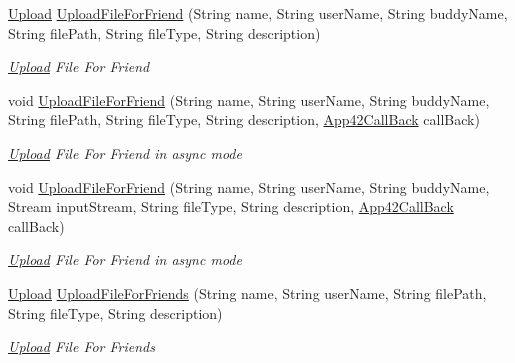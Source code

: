 \begin{DoxyCompactItemize}
\hyperlink{classcom_1_1shephertz_1_1app42_1_1paas_1_1sdk_1_1csharp_1_1upload_1_1_upload}{Upload} \hyperlink{classcom_1_1shephertz_1_1app42_1_1paas_1_1sdk_1_1csharp_1_1upload_1_1_upload_service_ab88251595838a7b8fbd9a09752a97bfb}{Upload\+File\+For\+Friend} (String name, String user\+Name, String buddy\+Name, String file\+Path, String file\+Type, String description)
\begin{DoxyCompactList}\small\item\em \hyperlink{classcom_1_1shephertz_1_1app42_1_1paas_1_1sdk_1_1csharp_1_1upload_1_1_upload}{Upload} File For Friend \end{DoxyCompactList}\item 
void \hyperlink{classcom_1_1shephertz_1_1app42_1_1paas_1_1sdk_1_1csharp_1_1upload_1_1_upload_service_af310400bc56e8b179d45e5239cbbe9d9}{Upload\+File\+For\+Friend} (String name, String user\+Name, String buddy\+Name, String file\+Path, String file\+Type, String description, \hyperlink{interfacecom_1_1shephertz_1_1app42_1_1paas_1_1sdk_1_1csharp_1_1_app42_call_back}{App42\+Call\+Back} call\+Back)
\begin{DoxyCompactList}\small\item\em \hyperlink{classcom_1_1shephertz_1_1app42_1_1paas_1_1sdk_1_1csharp_1_1upload_1_1_upload}{Upload} File For Friend in async mode \end{DoxyCompactList}\item 
void \hyperlink{classcom_1_1shephertz_1_1app42_1_1paas_1_1sdk_1_1csharp_1_1upload_1_1_upload_service_a63585d9db27794ef5e9c897a61c5f652}{Upload\+File\+For\+Friend} (String name, String user\+Name, String buddy\+Name, Stream input\+Stream, String file\+Type, String description, \hyperlink{interfacecom_1_1shephertz_1_1app42_1_1paas_1_1sdk_1_1csharp_1_1_app42_call_back}{App42\+Call\+Back} call\+Back)
\begin{DoxyCompactList}\small\item\em \hyperlink{classcom_1_1shephertz_1_1app42_1_1paas_1_1sdk_1_1csharp_1_1upload_1_1_upload}{Upload} File For Friend in async mode \end{DoxyCompactList}\item 
\hyperlink{classcom_1_1shephertz_1_1app42_1_1paas_1_1sdk_1_1csharp_1_1upload_1_1_upload}{Upload} \hyperlink{classcom_1_1shephertz_1_1app42_1_1paas_1_1sdk_1_1csharp_1_1upload_1_1_upload_service_a6af7c3fc4fcd0808281602c6c1f35dc7}{Upload\+File\+For\+Friends} (String name, String user\+Name, String file\+Path, String file\+Type, String description)
\begin{DoxyCompactList}\small\item\em \hyperlink{classcom_1_1shephertz_1_1app42_1_1paas_1_1sdk_1_1csharp_1_1upload_1_1_upload}{Upload} File For Friends \end{DoxyCompactList}\item 

\end{DoxyCompactItemize}
